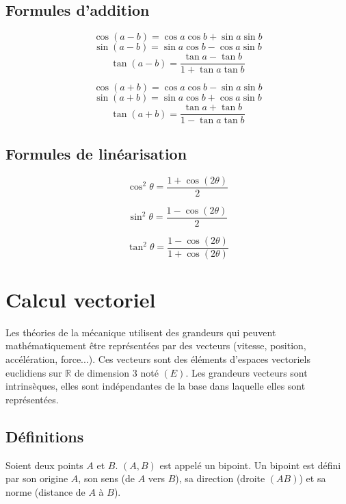 \documentclass[11pt]{article}
\begin{document}
\subsection{Formules d'addition}
\vspace{-1em}
\noindent
\begin{minipage}[c]{0.45\linewidth}
\[ \cos(a-b)=\cos a\cos b+\sin a\sin b\]
\[ \sin(a-b)=\sin a\cos b-\cos a\sin b\]
\[ \tan(a-b)=\dfrac{\tan a-\tan b}{1+\tan a\tan b} \]
\end{minipage} \hfill
\begin{minipage}[c]{.45\linewidth}
\[ \cos(a+b)=\cos a\cos b-\sin a\sin b\] 
\[ \sin(a+b)=\sin a\cos b+\cos a\sin b\] 
\[ \tan(a+b)=\dfrac{\tan a+\tan b}{1-\tan a\tan b} \]
\end{minipage} 


\subsection{Formules de linéarisation}
\vspace{-1em}
\noindent
\begin{minipage}[c]{0.3\linewidth}
\[ \cos^2\theta =\dfrac{1+\cos(2\theta)}{2}\] 
\end{minipage} \hfill
\begin{minipage}[c]{.3\linewidth}
\[ \sin^2\theta =\dfrac{1-\cos(2\theta)}{2}\] 
\end{minipage} \hfill
\begin{minipage}[c]{.3\linewidth}
\[ \tan^2\theta =\dfrac{1-\cos(2\theta)}{1+\cos(2\theta)}\] 
\end{minipage} 


\section{Calcul vectoriel}
Les théories de la mécanique utilisent des grandeurs qui peuvent mathématiquement être représentées par des vecteurs (vitesse, position, accélération, force...). Ces vecteurs sont des éléments d'espaces vectoriels euclidiens sur $\mathbb{R}$ de dimension 3 noté $(E)$. Les grandeurs vecteurs sont intrinsèques, elles sont indépendantes de la base dans laquelle elles sont représentées. 

\subsection{Définitions}

Soient deux points $A$ et $B$. $(A,B)$ est appelé un bipoint. Un bipoint est défini par son origine $A$, son sens (de $A$ vers $B$), sa direction (droite $(AB)$) et sa norme (distance de $A$ à $B$). 
\end{document}
